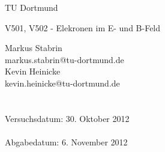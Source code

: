 \documentclass{scrartcl}
\begin{document}
	
	\vspace*{3cm}

	\begin{center}
		\large
		TU Dortmund
	\end{center}

	\begin{center}
		\Huge
		V501, V502 - Elekronen im E- und B-Feld
	\end{center}

	\vspace{6cm}
	\begin{center}
		\begin{minipage}[b]{8cm}
			\Large
			Markus Stabrin \\
			\normalsize
			markus.stabrin@tu-dortmund.de \\

			\Large
			Kevin Heinicke\\
			\normalsize
			kevin.heinicke@tu-dortmund.de \\
			\\
			\\

			Versuchsdatum: 30. Oktober 2012 \\
			\\
			Abgabedatum: 6. November 2012
		\end{minipage}
	\end{center}


	\newpage

	

	

	

	
\end{document}
